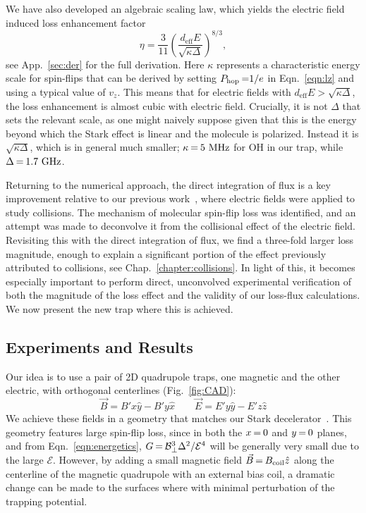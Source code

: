 We have also developed an algebraic scaling law, which yields the electric field induced loss enhancement factor
\begin{equation}
\label{eq:etaMT}
\eta=\frac{3}{11} \left(\frac{d_\text{eff}E}{\sqrt{\kappa\Delta}}\right)^{8/3},
\end{equation}
see App.~\ref{sec:der} for the full derivation.
Here $\kappa$ represents a characteristic energy scale for spin-flips that can be derived by setting $P_\text{hop}{\nobreak\hspace{.2em}} {=}1/e$ in Eqn.~\ref{eqn:lz} and using a typical value of $v_z$.
This means that for electric fields with $d_\text{eff}E>\sqrt{\kappa\Delta}$, the loss enhancement is almost cubic with electric field.
Crucially, it is not $\Delta$ that sets the relevant scale, as one might naively suppose given that this is the energy beyond which the Stark effect is linear and the molecule is polarized.
Instead it is $\sqrt{\kappa\Delta}$, which is in general much smaller; $\kappa{\nobreak\hspace{.2em}} {=}{\nobreak\hspace{.2em}} 5\text{ MHz}$ for OH in our trap, while $\Delta{\nobreak\hspace{.2em}} {=}{\nobreak\hspace{.2em}}1.7\text{ GHz}$.

Returning to the numerical approach, the direct integration of flux is a key improvement relative to our previous work~\cite{Stuhl2013}, where electric fields were applied to study collisions.
The mechanism of molecular spin-flip loss was identified, and an attempt was made to deconvolve it from the collisional effect of the electric field.
Revisiting this with the direct integration of flux, we find a three-fold larger loss magnitude, enough to explain a significant portion of the effect previously attributed to collisions, see Chap.~\ref{chapter:collisions}.
In light of this, it becomes especially important to perform direct, unconvolved experimental verification of both the magnitude of the loss effect and the validity of our loss-flux calculations.
We now present the new trap where this is achieved.


\subsection{Experiments and Results\label{sec:results}}

Our idea is to use a pair of 2D quadrupole traps, one magnetic and the other electric, with orthogonal centerlines (Fig.~\ref{fig:CAD}):
\begin{equation}
\label{eqn:BE}
\vec{B}=B'x\hat{y}-B'y\hat{x}\quad\quad\vec{E}=E'y\hat{y}-E'z\hat{z}
\end{equation}
We achieve these fields in a geometry that matches our Stark decelerator~\cite{Bochinski2003}.
This geometry features large spin-flip loss, since \epb{} in both the $x{\nobreak\hspace{.2em}} {=}{\nobreak\hspace{.2em}} 0$ and $y{\nobreak\hspace{.2em}} {=}{\nobreak\hspace{.2em}} 0$ planes, and from Eqn.~\ref{eqn:energetics}, $G{\nobreak\hspace{.2em}} {=} {\nobreak\hspace{.2em}} \mathcal{B}_\perp^3\Delta^2/\mathcal{E}^4$ will be generally very small due to the large $\mathcal{E}$.
However, by adding a small magnetic field $\vec{B}{\nobreak\hspace{.2em}} {=}{\nobreak\hspace{.2em}} B_\text{coil}\hat{z}$ along the centerline of the magnetic quadrupole with an external bias coil, a dramatic change can be made to the surfaces where \epb{} with minimal perturbation of the trapping potential.

